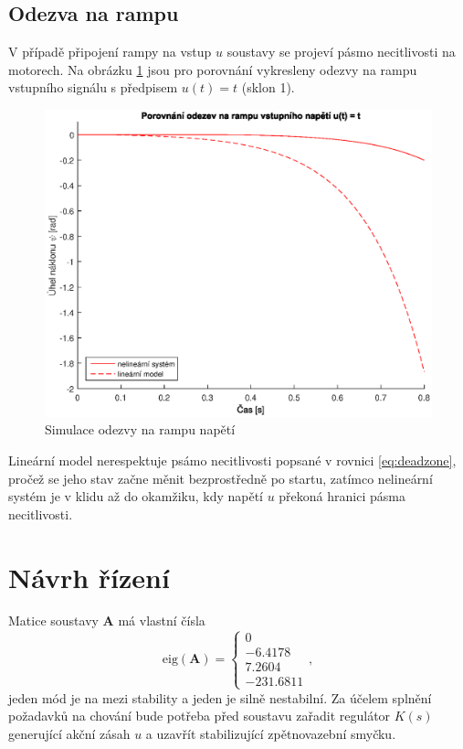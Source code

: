 \documentclass[conference]{IEEEtran}
\begin{document}
\subsection{Odezva na rampu}
V případě připojení rampy na vstup $u$ soustavy se projeví pásmo necitlivosti na motorech. Na obrázku \ref{fig:porovnani_rampa} jsou pro porovnání
vykresleny odezvy na rampu vstupního signálu s předpisem $u(t) = t$ (sklon 1). 
\begin{figure}[htbp]
    \centerline{\includegraphics[width=\linewidth]{porovnani_rampa.eps}}
    \caption{Simulace odezvy na rampu napětí}
    \label{fig:porovnani_rampa}        
\end{figure}
Lineární model nerespektuje psámo necitlivosti popsané v rovnici \eqref{eq:deadzone}, pročež se jeho stav začne měnit bezprostředně po startu,
zatímco nelineární systém je v klidu až do okamžiku, kdy napětí $u$ překoná hranici pásma necitlivosti.

\section{Návrh řízení}
Matice soustavy $\textbf{A}$ má vlastní čísla 
\begin{equation}
	\text{eig}(\mathbf{A}) =
	\begin{cases}
        0 \\
        -6.4178 \\
        7.2604 \\
        -231.6811
    \end{cases},
    \label{eq:unstable_poles}
\end{equation}
jeden mód je na mezi stability a jeden je silně nestabilní. Za účelem splnění požadavků na chování bude potřeba před soustavu zařadit regulátor $K(s)$ generující
akční zásah $u$ a uzavřít stabilizující zpětnovazební smyčku.
\end{document}

